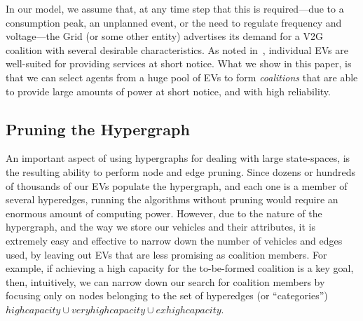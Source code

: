 In our model, we assume that, at any time step that this is required---due to a consumption peak, an unplanned event, or the need to regulate frequency and voltage---the Grid (or some other entity) advertises its demand for a V2G coalition with several desirable characteristics. As noted in~\cite{kamboj2011deploying}, individual EVs are well-suited for providing services at short notice. What we show in this paper, is that we can select agents from a huge pool of EVs to form {\em coalitions} that are able to provide large amounts of power at short notice, and with high reliability.




\subsection{Pruning the Hypergraph}\label{sec:pruning}

An important aspect of using hypergraphs for dealing with large state-spaces, is the resulting ability to perform node and edge pruning. Since dozens or hundreds of thousands of our EVs populate the hypergraph, and each one is a member of several hyperedges, running the algorithms without pruning would require an enormous amount of computing power. However, due to the nature of the hypergraph, and the way we store our vehicles and their attributes, it is extremely easy and effective to narrow down the number of vehicles and edges used, by leaving out EVs that are less promising as coalition members. For example, if achieving a high capacity for the to-be-formed coalition is a key goal, then, intuitively, we can narrow down our search for coalition members by focusing only on nodes belonging to the set of hyperedges (or ``categories'') $high capacity \cup very high capacity \cup ex high capacity$. 

